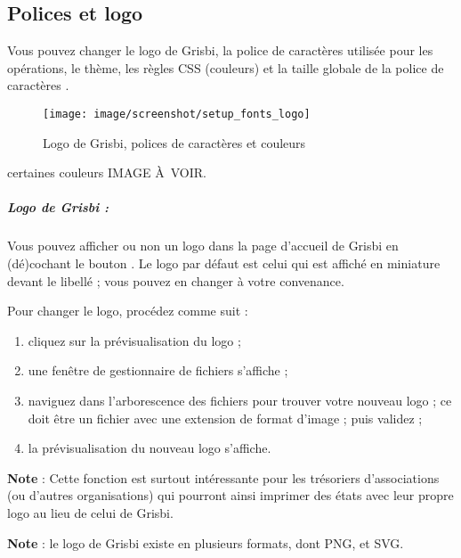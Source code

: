 \subsection{Polices et logo\label{setup-display-logo}}

Vous pouvez changer le logo de Grisbi, la police de caractères utilisée pour les opérations, le thème, les règles CSS (couleurs) et la taille globale de la police de caractères \ifIllustration  {}.
\begin{figure}[htbp]
\begin{center}
\texttt{[image: image/screenshot/setup\_fonts\_logo]}
\end{center}
\caption{Logo de Grisbi, polices de caractères et couleurs}
\label{setup-fonts-logo-img}
\end{figure}
\else certaines couleurs IMAGE À VOIR.
\fi


\subparagraph{Logo de Grisbi :\label{setup-display-logo-icon}}

Vous pouvez afficher ou non un logo dans la page d'accueil de Grisbi en (dé)cochant le bouton . Le logo par défaut est celui qui est affiché en miniature devant le libellé  ; vous pouvez en changer à votre convenance. 

Pour changer le logo, procédez comme suit :

\begin{enumerate}
	\item cliquez sur la prévisualisation du logo ;
	\item une fenêtre de gestionnaire de fichiers s'affiche ;
	\item naviguez dans l'arborescence des fichiers pour trouver votre nouveau logo ; ce doit être un fichier avec une extension de format d'image ; puis validez ;
	\item la prévisualisation du nouveau logo s'affiche.
\end{enumerate}

\textbf{Note} : Cette fonction est surtout intéressante pour les trésoriers d'associations (ou d'autres organisations) qui pourront ainsi imprimer des états avec leur propre logo au lieu de celui de Grisbi.

\textbf{Note} : le logo de Grisbi existe en plusieurs formats, dont \gls{PNG}, et \gls{SVG}.

